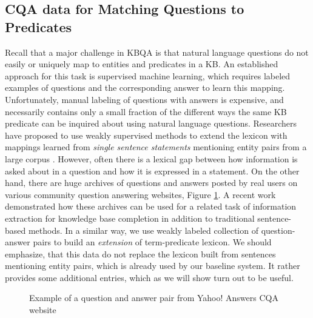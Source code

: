 \subsection{CQA data for Matching Questions to Predicates}
\label{section:method:cqa}

Recall that a major challenge in KBQA is that natural language questions do not easily or uniquely map to entities and predicates in a KB.
An established approach for this task is supervised machine learning, which requires labeled examples of questions and the corresponding answer to learn this mapping.
Unfortunately, manual labeling of questions with answers is expensive, and necessarily contains only a small fraction of the different ways the same KB predicate can be inquired about using natural language questions.
Researchers have proposed to use weakly supervised methods to extend the lexicon with mappings learned from \textit{single sentence statements} mentioning entity pairs from a large corpus \cite{yao2014information}.
However, often there is a lexical gap between how information is asked about in a question and how it is expressed in a statement.
On the other hand, there are huge archives of questions and answers posted by real users on various community question answering websites, \eg Figure \ref{fig:cqa_example}.
A recent work~\cite{savenkov-EtAl:2015:SRW} demonstrated how these archives can be used for a related task of information extraction for knowledge base completion in addition to traditional sentence-based methods.
In a similar way, we use weakly labeled collection of question-answer pairs to build an \textit{extension} of term-predicate lexicon.
We should emphasize, that this data do not replace the lexicon built from sentences mentioning entity pairs, which is already used by our baseline system.
It rather provides some additional entries, which as we will show turn out to be useful.

\begin{figure}
\centering
{}
\vspace{-0.5cm}
\caption{Example of a question and answer pair from Yahoo! Answers CQA website}
\label{fig:cqa_example}
\vspace{-0.4cm}
\end{figure}

